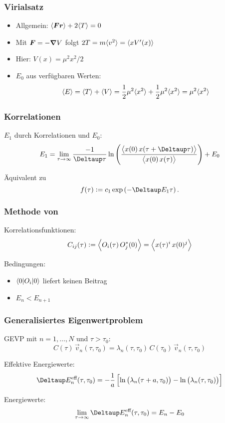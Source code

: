 \documentclass[ngerman, fleqn]{beamer}
\newcommand\timestep{a}
\begin{document}
\begin{frame}
    \frametitle{Virialsatz}

    \begin{itemize}
    
        \item
    Allgemein: $\langle \boldsymbol{F} \boldsymbol{r} \rangle + 2 \langle T \rangle = 0$

\item
    Mit $\boldsymbol{F} = - \boldsymbol{\nabla} V$ folgt $2 T = m \langle v^2 \rangle = \langle x V'(x) \rangle$

\item
    Hier: $V(x) = \mu^2 x^2 /2$

\item
    $E_0$ aus verfügbaren Werten:
    \[
        \langle E \rangle = \langle T \rangle + \langle V \rangle
        = \frac12 \mu^2 \langle x^2 \rangle + \frac12 \mu^2 \langle x^2 \rangle
        = \mu^2 \langle x^2 \rangle
    \]
    \end{itemize}
\end{frame}

\begin{frame}
    \frametitle{Korrelationen}

    $E_1$ durch Korrelationen und $E_0$:
    \[
        E_1 = \lim_{\tau \to \infty} \frac{-1}{\Deltaup \tau} \ln
        \del{\frac{\Bracket{x(0) \, x(\tau + \Deltaup \tau)}}{\Bracket{x(0) \,
        x(\tau)}}} + E_0
    \]

    Äquivalent zu
    \[
        f(\tau) := c_1 \exp\del{-\Deltaup E_1 \tau}.
    \]
\end{frame}


\begin{frame}
    \frametitle{Methode von \cite{Blossier/Eigenvalue}}

    
    Korrelationsfunktionen:
    \[
        C_{ij}(\tau) := \left\langle O_i(\tau) \, O_j^*(0) \right\rangle
        = \left\langle x(\tau)^i \, x(0)^j \right\rangle
    \]

    Bedingungen:
    \begin{itemize}
        \item
            $\braket{0 | O_i | 0}$ liefert keinen Beitrag
        \item
            $E_n < E_{n+1}$
    \end{itemize}
\end{frame}

\begin{frame}
    \frametitle{Generalisiertes Eigenwertproblem}

    GEVP mit $n = 1, \ldots, N$ und $\tau > \tau_0$:
    \[
        C(\tau) \, \vec v_n(\tau, \tau_0) = \lambda_n(\tau, \tau_0) \, 
        C(\tau_0) \, \vec v_n(\tau, \tau_0)
    \]

    Effektive Energiewerte:
    \[
        \Deltaup E_n^\text{eff}(\tau, \tau_0) = -
        \frac 1\timestep \sbr{ \ln\del{\lambda_n(\tau+\timestep, \tau_0)} -
        \ln\del{\lambda_n(\tau, \tau_0)} }
    \]

    Energiewerte:
    \[
        \lim_{\tau \to \infty} \Deltaup E_n^\text{eff}(\tau, \tau_0) = E_n - E_0
    \]

\end{frame}
\end{document}
